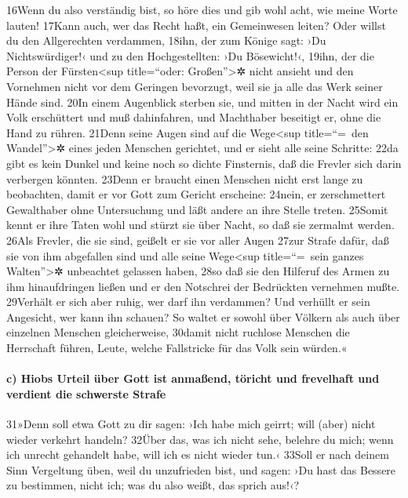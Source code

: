 16Wenn du also verständig bist, so höre dies und gib wohl acht, wie
meine Worte lauten! 17Kann auch, wer das Recht haßt, ein Gemeinwesen
leiten? Oder willst du den Allgerechten verdammen, 18ihn, der zum Könige
sagt: ›Du Nichtswürdiger!‹ und zu den Hochgestellten: ›Du Bösewicht!‹,
19ihn, der die Person der Fürsten\textless sup title=``oder:
Großen''\textgreater✲ nicht ansieht und den Vornehmen nicht vor dem
Geringen bevorzugt, weil sie ja alle das Werk seiner Hände sind. 20In
einem Augenblick sterben sie, und mitten in der Nacht wird ein Volk
erschüttert und muß dahinfahren, und Machthaber beseitigt er, ohne die
Hand zu rühren. 21Denn seine Augen sind auf die Wege\textless sup
title=``=~den Wandel''\textgreater✲ eines jeden Menschen gerichtet, und
er sieht alle seine Schritte: 22da gibt es kein Dunkel und keine noch so
dichte Finsternis, daß die Frevler sich darin verbergen könnten. 23Denn
er braucht einen Menschen nicht erst lange zu beobachten, damit er vor
Gott zum Gericht erscheine: 24nein, er zerschmettert Gewalthaber ohne
Untersuchung und läßt andere an ihre Stelle treten. 25Somit kennt er
ihre Taten wohl und stürzt sie über Nacht, so daß sie zermalmt werden.
26Als Frevler, die sie sind, geißelt er sie vor aller Augen 27zur Strafe
dafür, daß sie von ihm abgefallen sind und alle seine Wege\textless sup
title=``=~sein ganzes Walten''\textgreater✲ unbeachtet gelassen haben,
28so daß sie den Hilferuf des Armen zu ihm hinaufdringen ließen und er
den Notschrei der Bedrückten vernehmen mußte. 29Verhält er sich aber
ruhig, wer darf ihn verdammen? Und verhüllt er sein Angesicht, wer kann
ihn schauen? So waltet er sowohl über Völkern als auch über einzelnen
Menschen gleicherweise, 30damit nicht ruchlose Menschen die Herrschaft
führen, Leute, welche Fallstricke für das Volk sein würden.«

\hypertarget{c-hiobs-urteil-uxfcber-gott-ist-anmauxdfend-tuxf6richt-und-frevelhaft-und-verdient-die-schwerste-strafe}{%
\paragraph{c) Hiobs Urteil über Gott ist anmaßend, töricht und
frevelhaft und verdient die schwerste
Strafe}\label{c-hiobs-urteil-uxfcber-gott-ist-anmauxdfend-tuxf6richt-und-frevelhaft-und-verdient-die-schwerste-strafe}}

31»Denn soll etwa Gott zu dir sagen: ›Ich habe mich geirrt; will (aber)
nicht wieder verkehrt handeln? 32Über das, was ich nicht sehe, belehre
du mich; wenn ich unrecht gehandelt habe, will ich es nicht wieder tun.‹
33Soll er nach deinem Sinn Vergeltung üben, weil du unzufrieden bist,
und sagen: ›Du hast das Bessere zu bestimmen, nicht ich; was du also
weißt, das sprich aus!‹?

